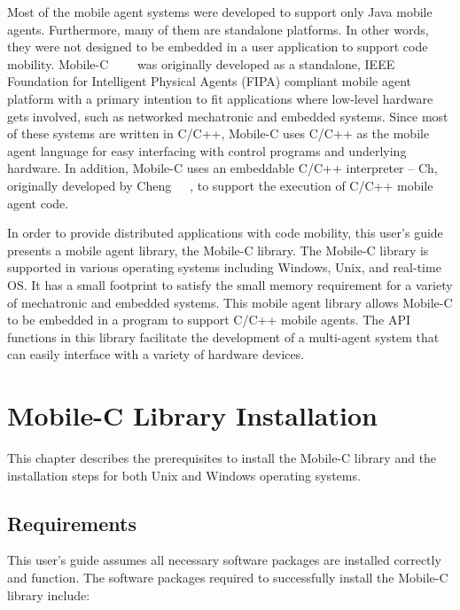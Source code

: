 \documentclass[11pt]{report}
\begin{document}
Most of the mobile agent systems were developed to support only Java mobile 
agents.
Furthermore, many of them are standalone platforms. 
In other words, they were not designed to be embedded in a user application 
to support code mobility.  
Mobile-C~\cite{Chenthesis}~\cite{Chen3}~\cite{Mobile-C}~\cite{mobilec_webpage} 
was originally developed as a standalone, IEEE Foundation for Intelligent 
Physical Agents (FIPA) compliant mobile agent platform with a primary 
intention to fit applications where low-level hardware gets involved, such as 
networked mechatronic and embedded systems. 
Since most of these systems are written in C/C++, Mobile-C uses C/C++ as 
the mobile agent language for easy interfacing with control programs and 
underlying hardware. 
In addition, Mobile-C uses an embeddable C/C++ interpreter -- Ch, originally 
developed by Cheng~\cite{SP1}~\cite{CUJ1}~\cite{Ch}, to support the execution 
of C/C++ mobile agent code. 

In order to provide distributed applications with code mobility, this 
user's guide presents a mobile agent library, the Mobile-C library. 
The Mobile-C library is supported in various operating systems including 
Windows, Unix, and real-time OS.
It has a small footprint to satisfy the small memory requirement for a 
variety of mechatronic and embedded systems. 
This mobile agent library allows Mobile-C to be embedded in a program to 
support C/C++ mobile agents.
The API functions in this library facilitate the development of a multi-agent
system that can easily interface with a variety of hardware devices. 

\chapter{Mobile-C Library Installation}
This chapter describes the prerequisites to install the Mobile-C library and 
the installation steps for both Unix and Windows operating systems.

\section{Requirements}
This user's guide assumes all necessary software packages are installed
correctly and function. 
The software packages required to successfully install the Mobile-C library 
include:
\end{document}
